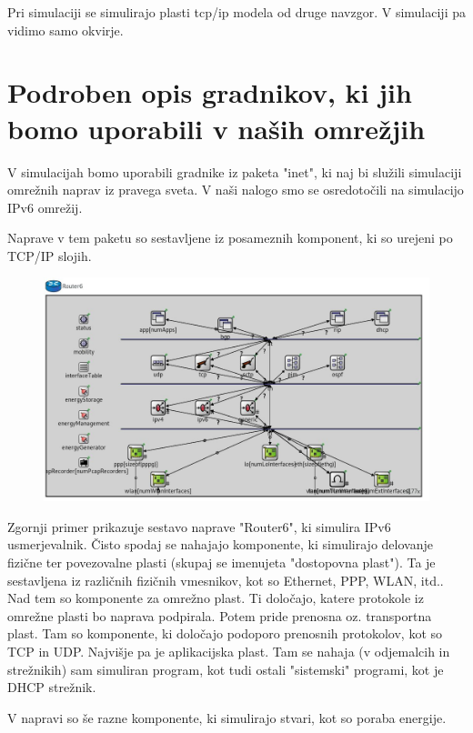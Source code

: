 \documentclass[11pt,a4paper,slovene]{myarticle}
\begin{document}
Pri simulaciji se simulirajo plasti tcp/ip modela od druge navzgor. V simulaciji pa vidimo samo okvirje.


\section{Podroben opis gradnikov, ki jih bomo uporabili v naših omrežjih}
V simulacijah bomo uporabili gradnike iz paketa "inet", ki naj bi služili simulaciji omrežnih naprav iz pravega sveta. V naši nalogo smo se osredotočili na simulacijo IPv6 omrežij.

Naprave v tem paketu so sestavljene iz posameznih komponent, ki so urejeni po TCP/IP slojih.

\begin{figure}[h]
  \includegraphics[width=\linewidth]{router6.jpg}
\end{figure}

Zgornji primer prikazuje sestavo naprave "Router6", ki simulira IPv6 usmerjevalnik.
Čisto spodaj se nahajajo komponente, ki simulirajo delovanje fizične ter povezovalne plasti (skupaj se imenujeta "dostopovna plast"). Ta je sestavljena iz različnih fizičnih vmesnikov, kot so Ethernet, PPP, WLAN, itd..
Nad tem so komponente za omrežno plast. Ti določajo, katere protokole iz omrežne plasti bo naprava podpirala.
Potem pride prenosna oz. transportna plast. Tam so komponente, ki določajo podoporo prenosnih protokolov, kot so TCP in UDP.
Najvišje pa je aplikacijska plast. Tam se nahaja (v odjemalcih in strežnikih) sam simuliran program, kot tudi ostali "sistemski" programi, kot je DHCP strežnik.

V napravi so še razne komponente, ki simulirajo stvari, kot so poraba energije.
\end{document}
